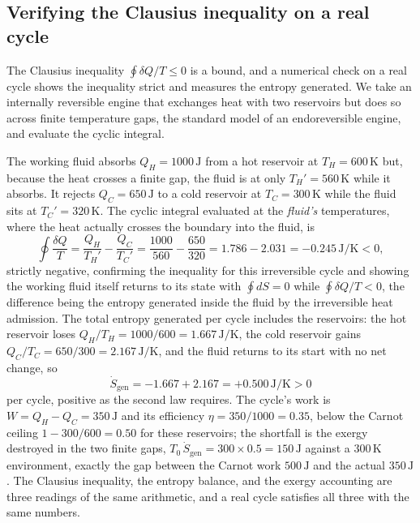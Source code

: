 \subsection{Verifying the Clausius inequality on a real cycle}

The Clausius inequality $\oint \delta Q/T \le 0$ is a bound, and a numerical
check on a real cycle shows the inequality strict and measures the entropy
generated. We take an internally reversible engine that exchanges heat with two
reservoirs but does so across finite temperature gaps, the standard model of an
endoreversible engine, and evaluate the cyclic integral.

The working fluid absorbs $Q_H = 1000\,\text{J}$ from a hot reservoir at
$T_H = 600\,\si{\kelvin}$ but, because the heat crosses a finite gap, the fluid
is at only $T_{H}' = 560\,\si{\kelvin}$ while it absorbs. It rejects $Q_C =
650\,\text{J}$ to a cold reservoir at $T_C = 300\,\si{\kelvin}$ while the fluid
sits at $T_{C}' = 320\,\si{\kelvin}$. The cyclic integral evaluated at the
\emph{fluid's} temperatures, where the heat actually crosses the boundary into
the fluid, is
\[
\oint \frac{\delta Q}{T} = \frac{Q_H}{T_H'} - \frac{Q_C}{T_C'}
= \frac{1000}{560} - \frac{650}{320}
= 1.786 - 2.031 = -0.245\,\si{\joule\per\kelvin} < 0,
\]
strictly negative, confirming the inequality for this irreversible cycle and
showing the working fluid itself returns to its state with $\oint dS = 0$ while
$\oint \delta Q/T < 0$, the difference being the entropy generated inside the
fluid by the irreversible heat admission. The total entropy generated per cycle
includes the reservoirs: the hot reservoir loses $Q_H/T_H = 1000/600 =
1.667\,\si{\joule\per\kelvin}$, the cold reservoir gains $Q_C/T_C = 650/300 =
2.167\,\si{\joule\per\kelvin}$, and the fluid returns to its start with no net
change, so
\[
\dot S_{\text{gen}} = -1.667 + 2.167 = +0.500\,\si{\joule\per\kelvin} > 0
\]
per cycle, positive as the second law requires. The cycle's work is $W = Q_H -
Q_C = 350\,\text{J}$ and its efficiency $\eta = 350/1000 = 0.35$, below the
Carnot ceiling $1 - 300/600 = 0.50$ for these reservoirs; the shortfall is the
exergy destroyed in the two finite gaps, $T_0\,\dot S_{\text{gen}} = 300 \times
0.5 = 150\,\text{J}$ against a $300\,\si{\kelvin}$ environment, exactly the gap
between the Carnot work $500\,\text{J}$ and the actual $350\,\text{J}$. The
Clausius inequality, the entropy balance, and the exergy accounting are three
readings of the same arithmetic, and a real cycle satisfies all three with the
same numbers.

